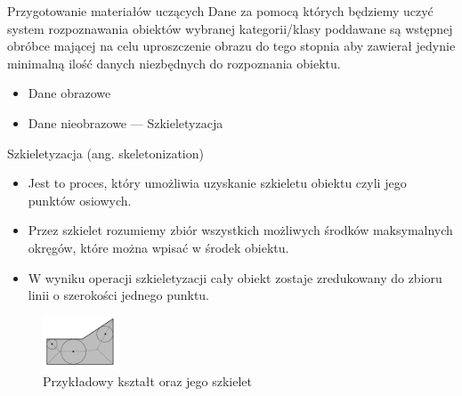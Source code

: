 \documentclass{beamer}
\begin{document}
\begin{frame}{Przygotowanie materiałów uczących}
Dane za pomocą których będziemy uczyć system rozpoznawania obiektów wybranej kategorii/klasy poddawane są wstępnej obróbce mającej na celu uproszczenie obrazu do tego stopnia aby zawierał jedynie minimalną ilość danych niezbędnych do rozpoznania obiektu.
\pause
\begin{itemize}
\item Dane obrazowe
\pause
\item Dane nieobrazowe --- Szkieletyzacja 
\end{itemize}
\end{frame}


\begin{frame}{Szkieletyzacja (ang. skeletonization)}
\begin{itemize}
\item Jest to proces, który umożliwia uzyskanie szkieletu obiektu czyli jego punktów osiowych.
\pause
\item Przez szkielet rozumiemy zbiór wszystkich możliwych środków maksymalnych okręgów, które można wpisać w środek obiektu.
\pause
\item W wyniku operacji szkieletyzacji cały obiekt zostaje zredukowany do zbioru linii o szerokości jednego punktu.
\pause
\end{itemize}

\begin{figure}
	\centering
		\includegraphics[width=0.2\textwidth]{szkieletyzacja.png}
		\caption{Przykładowy kształt oraz jego szkielet}
\end{figure}

\end{frame}
\end{document}
